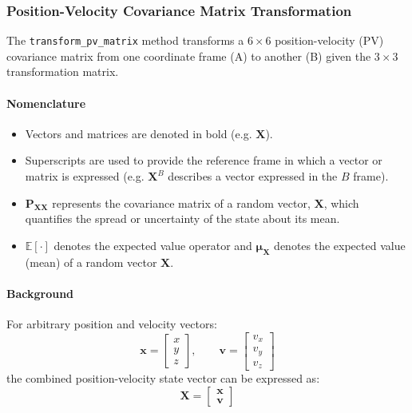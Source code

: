 \documentclass[11pt,fleqn]{report}
\begin{document}
\subsubsection{Position-Velocity Covariance Matrix Transformation}

The \texttt{transform\_pv\_matrix} method transforms a $6 \times 6$ 
position-velocity (PV) covariance matrix from one coordinate frame (A) 
to another (B) given the $3 \times 3$ transformation matrix.

\paragraph{Nomenclature}
\begin{itemize}
\item Vectors and matrices are denoted in bold (e.g. $\mathbf{X}$).
\item Superscripts are used to provide the reference frame in which a vector
or matrix is expressed (e.g. $\mathbf{X}^B$ describes a vector expressed
in the $B$ frame).
\item $\mathbf{P_{XX}}$ represents the covariance matrix of a random vector, 
$\mathbf{X}$, which quantifies the spread or uncertainty of the 
state about its mean.
\item $\mathbb{E}[\cdot]$ denotes the expected value operator and $\boldsymbol{\mu_{X}}$ 
denotes the expected value (mean) of a random vector $\mathbf{X}$.
\end{itemize}

\paragraph{Background} 
For arbitrary position and velocity vectors:
\[
\mathbf{x} = 
\begin{bmatrix}
x \\ y \\ z
\end{bmatrix}, \qquad
\mathbf{v} = 
\begin{bmatrix}
v_x \\ v_y \\ v_z
\end{bmatrix}
\]
the combined position-velocity state vector can be expressed as:
\[
\mathbf{X} = 
\begin{bmatrix}
\mathbf{x} \\ \mathbf{v}
\end{bmatrix}
\]
\end{document}

